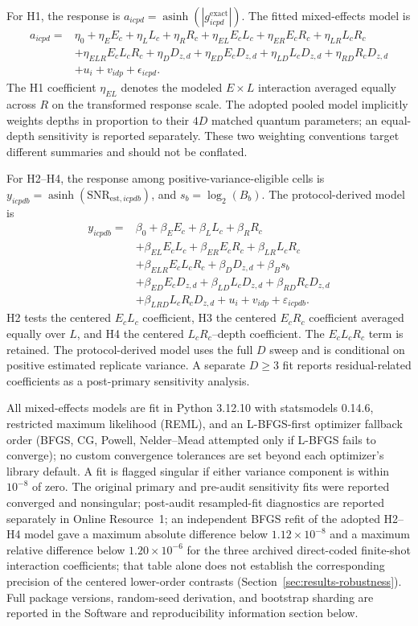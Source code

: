 \documentclass[pdflatex,sn-mathphys-num,Numbered]{sn-jnl}
\begin{document}
For H1, the response is $a_{icpd}=\operatorname{asinh}(|g^{\mathrm{exact}}_{icpd}|)$. The fitted mixed-effects model is
\begin{align}
 a_{icpd}={}&\eta_0+\eta_EE_c+\eta_LL_c+\eta_RR_c
 +\eta_{EL}E_cL_c+\eta_{ER}E_cR_c+\eta_{LR}L_cR_c\nonumber\\
 &+\eta_{ELR}E_cL_cR_c+\eta_DD_{z,d}
 +\eta_{ED}E_cD_{z,d}+\eta_{LD}L_cD_{z,d}+\eta_{RD}R_cD_{z,d}\nonumber\\
 &+u_i+v_{idp}+\epsilon_{icpd}.\label{eq:h1model}
\end{align}
The H1 coefficient $\eta_{EL}$ denotes the modeled $E\times L$ interaction averaged equally across $R$ on the transformed response scale. The adopted pooled model implicitly weights depths in proportion to their $4D$ matched quantum parameters; an equal-depth sensitivity is reported separately. These two weighting conventions target different summaries and should not be conflated.



For H2--H4, the response among positive-variance-eligible cells is $y_{icpdb}=\operatorname{asinh}(\mathrm{SNR}_{\mathrm{est},icpdb})$, and $s_b=\log_2(B_b)$. The protocol-derived model is
\begin{align*}
y_{icpdb}={}&\beta_0
+\beta_E E_c+\beta_L L_c+\beta_R R_c\\
&+\beta_{EL}E_cL_c+\beta_{ER}E_cR_c+\beta_{LR}L_cR_c\\
&+\beta_{ELR}E_cL_cR_c+\beta_DD_{z,d}+\beta_B s_b\\
&+\beta_{ED}E_cD_{z,d}+\beta_{LD}L_cD_{z,d}+\beta_{RD}R_cD_{z,d}\\
&+\beta_{LRD}L_cR_cD_{z,d}
+u_i+v_{idp}+\varepsilon_{icpdb}.
\end{align*}
H2 tests the centered $E_cL_c$ coefficient, H3 the centered $E_cR_c$ coefficient averaged equally over $L$, and H4 the centered $L_cR_c$--depth coefficient. The $E_cL_cR_c$ term is retained. The protocol-derived model uses the full $D$ sweep and is conditional on positive estimated replicate variance. A separate $D\ge3$ fit reports residual-related coefficients as a post-primary sensitivity analysis.

All mixed-effects models are fit in Python 3.12.10 with statsmodels 0.14.6, restricted maximum likelihood (REML), and an L-BFGS-first optimizer fallback order (BFGS, CG, Powell, Nelder--Mead attempted only if L-BFGS fails to converge); no custom convergence tolerances are set beyond each optimizer's library default. A fit is flagged singular if either variance component is within $10^{-8}$ of zero. The original primary and pre-audit sensitivity fits were reported converged and nonsingular; post-audit resampled-fit diagnostics are reported separately in Online Resource~1; an independent BFGS refit of the adopted H2--H4 model gave a maximum absolute difference below $1.12\times10^{-8}$ and a maximum relative difference below $1.20\times10^{-6}$ for the three archived direct-coded finite-shot interaction coefficients; that table alone does not establish the corresponding precision of the centered lower-order contrasts (Section~\ref{sec:results-robustness}). Full package versions, random-seed derivation, and bootstrap sharding are reported in the Software and reproducibility information section below.
\end{document}
